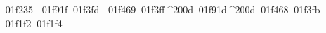 \documentclass[varwidth, margin=4pt]{standalone}
\begin{document}
\EmojiFont
^^^^^^01f235
^^^^^^01f91f^^^^^^01f3fd
^^^^^^01f469^^^^^^01f3ff^^^^200d^^^^^^01f91d^^^^200d^^^^^^01f468^^^^^^01f3fb
^^^^^^01f1f2^^^^^^01f1f4
\end{document}
